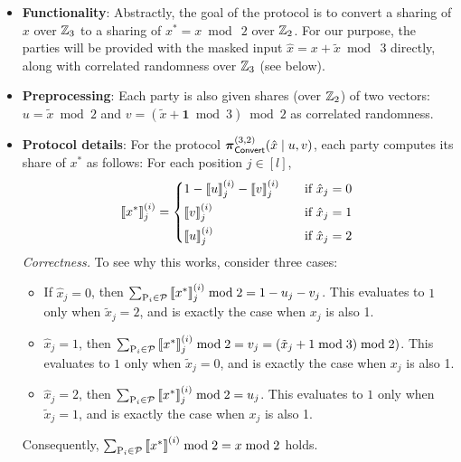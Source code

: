 \begin{itemize}
  \item \textbf{Functionality}: Abstractly, the goal of the protocol is to convert a sharing of $x$ over $\mathbb{Z}_3$ to a sharing of $x^* = x \bmod~2$ over $\mathbb{Z}_2$. For our purpose, the parties will be provided with the masked input $\hat{x} = x + \tilde{x} \bmod~3$ directly, along with correlated randomness over $\mathbb{Z}_3$ (see below).

  \item \textbf{Preprocessing}: Each party is also given shares (over $\mathbb{Z}_2$) of two vectors: $u = \tilde{x} \bmod 2$ and $v = (\tilde{x} + \textbf{1} \bmod 3) \bmod 2$ as correlated randomness.


  \item \textbf{Protocol details}: For the protocol $\boldsymbol{\pi}_{\textnormal{\textsf{Convert}}}^{(3,2)}(\hat{x} \mid u, v)$, each party computes its share of $x^*$ as follows: For each position $j \in [l]$,
\[
\sharei{x^*}_j = 
\begin{cases*}
       1 - \sharei{u}_j - \sharei{v}_j  & \quad if $\hat{x}_j = 0$ \\
       \sharei{v}_j & \quad if $\hat{x}_j = 1$ \\
       \sharei{u}_j & \quad if $\hat{x}_j = 2$
\end{cases*}
\]
\textit{Correctness.} To see why this works, consider three cases:
\begin{itemize}
\item If $\hat{x}_j = 0$, then $\sum_{\textnormal{P}_i \in \mathcal{P}} \left\llbracket x^* \right\rrbracket^{(i)}_j \bmod 2 = 1 - u_j - v_j$. This evaluates to $1$ only when $\tilde{x}_j = 2$, and is exactly the case when $x_j$ is also 1.

\item $\hat{x}_j = 1$, then $\sum_{\textnormal{P}_i \in \mathcal{P}} \left\llbracket x^* \right\rrbracket^{(i)}_j \bmod 2 = v_j = (\tilde{x}_j + 1 \bmod 3) \bmod 2)$. This evaluates to $1$ only when $\tilde{x}_j = 0$, and is exactly the case when $x_j$ is also 1.

\item $\hat{x}_j = 2$, then $\sum_{\textnormal{P}_i \in \mathcal{P}} \left\llbracket x^* \right\rrbracket^{(i)}_j \bmod 2 = u_j$. This evaluates to $1$ only when $\tilde{x}_j = 1$, and is exactly the case when $x_j$ is also 1.
\end{itemize}
Consequently, $\sum_{\textnormal{P}_i \in \mathcal{P}} \left\llbracket x^* \right\rrbracket^{(i)} \bmod 2 = x \bmod 2$ holds.
\end{itemize}



